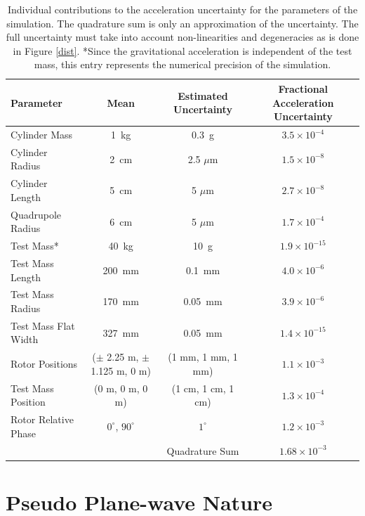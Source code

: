 \documentclass[superscriptaddress, twocolumn, prd]{revtex4-1}
\begin{document}
\begin{widetext}
\begingroup
\setlength{\tabcolsep}{10pt} %
\renewcommand{\arraystretch}{1.5} %

\begin{table}[h!]
\begin{center}
\begin{tabular}{ |l|c|c|c| }
\hline
 Parameter & Mean & Estimated Uncertainty & Fractional Acceleration Uncertainty\\
 \hline

Cylinder Mass & 1~kg & 0.3~g & $3.5\times10^{-4}$\\
Cylinder Radius & 2~cm & 2.5 $\mu$m & $1.5\times10^{-8}$\\
Cylinder Length & 5~cm & 5 $\mu$m & $2.7\times10^{-8}$\\
Quadrupole Radius & 6~cm & 5 $\mu$m &$1.7\times10^{-4}$\\
Test Mass* & 40~kg & 10~g & $1.9\times10^{-15}$\\
Test Mass Length & 200~mm & 0.1~mm& $4.0\times10^{-6}$\\
Test Mass Radius & 170~mm & 0.05~mm& $3.9\times10^{-6}$\\
Test Mass Flat Width & 327~mm & 0.05~mm&$1.4\times10^{-15}$\\
Rotor Positions & ($\pm$ 2.25 m, $\pm$ 1.125 m, 0 m) & (1 mm, 1 mm, 1 mm) &$1.1\times10^{-3}$\\
Test Mass Position & (0 m, 0 m, 0 m) & (1 cm, 1 cm, 1 cm) &$1.3\times10^{-4}$\\
Rotor Relative Phase & $0^\circ$, $90^\circ$ & $1^\circ$ & $1.2\times10^{-3}$\\
 \hline
 \hline
& &Quadrature Sum  &$1.68\times10^{-3}$\\
\hline
 \end{tabular}
 \caption{Individual contributions to the acceleration uncertainty for the parameters of the simulation. The quadrature sum is only an approximation of the uncertainty. The full uncertainty must take into account non-linearities and degeneracies as is done in Figure \ref{dist}. *Since the gravitational acceleration is independent of the test mass, this entry represents the numerical precision of the simulation.}\label{uncert}
 \end{center}

\end{table}
\endgroup
\end{widetext}

\section{Pseudo Plane-wave Nature}\label{pseudo}
\end{document}

